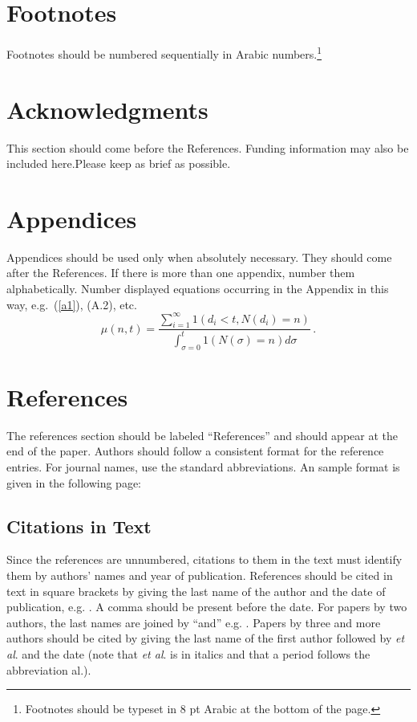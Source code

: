 \documentclass{ijcs_template}
\begin{document}
\section{Footnotes}
Footnotes should be numbered sequentially in Arabic
numbers.\footnote{Footnotes should be typeset in 8 pt Arabic at the
bottom of the page.}

\section*{Acknowledgments}
This section should come before the References. Funding information
may also be included here.Please keep as brief as possible.

\appendix

\section{Appendices}

Appendices should be used only when absolutely necessary. They should
come after the References. If there is more than one appendix, number
them alphabetically. Number displayed equations occurring in the
Appendix in this way, e.g.~(\ref{a1}), (A.2), etc.
\begin{equation}
\mu(n, t) = \frac{\sum^\infty_{i=1} 1(d_i < t,
N(d_i) = n)}{\int^t_{\sigma=0} 1(N(\sigma) = n)d\sigma}\,.
\label{a1}
\end{equation}

\section*{References}
The references section should be labeled ``References'' and should appear
at the end of the paper. Authors should follow a consistent format
for the reference entries. For journal names, use the standard abbreviations.
An sample format is given in the following page:

\subsection*{Citations in Text}
Since the references are unnumbered, citations to them in the text
must identify them by authors' names and year of
publication. References should be cited in text in square brackets by
giving the last name of the author and the date of publication,
e.g. \cite{wong89}. A comma should be present before the date.  For
papers by two authors, the last names are joined by ``and''
e.g. \cite{hussaini}. Papers by three and more authors should be cited
by  giving the last name of the first author followed by {\it et al}.
and the date (note that {\it et al}. is in italics and that a period
follows the abbreviation al.).
\end{document}
